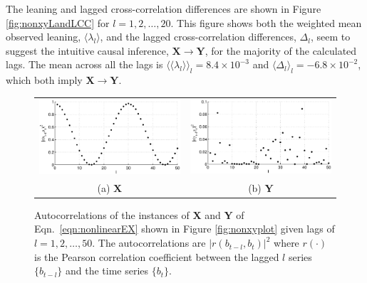 The leaning and lagged cross-correlation differences are shown in Figure \ref{fig:nonxyLandLCC} for $l=1,2,\ldots,20$.  This figure shows both the weighted mean observed leaning, $\langle \lambda_l\rangle$, and the lagged cross-correlation differences, $\Delta_l$, seem to suggest the intuitive causal inference, $\mathbf{X}\rightarrow\mathbf{Y}$, for the majority of the calculated lags.  The mean across all the lags is $\langle\langle\lambda_l\rangle\rangle_l=8.4\times 10^{-3}$ and $\langle\Delta_l\rangle_l=-6.8\times 10^{-2}$, which both imply $\mathbf{X}\rightarrow\mathbf{Y}$.  
\begin{figure}[ht]
\begin{tabular}{cc}
\includegraphics[scale=0.48]{NonlinearResponseExample_autocorrX.eps} & \includegraphics[scale=0.48]{NonlinearResponseExample_autocorrY.eps} \\
(a) $\mathbf{X}$ & (b) $\mathbf{Y}$
\end{tabular}
\caption{Autocorrelations of the instances of $\mathbf{X}$ and $\mathbf{Y}$ of Eqn.\ \ref{eqn:nonlinearEX} shown in Figure \ref{fig:nonxyplot} given lags of $l=1,2,\ldots,50$.  The autocorrelations are $|r(b_{t-l},b_t)|^2$ where $r(\cdot)$ is the Pearson correlation coefficient between the lagged $l$ series $\{b_{t-l}\}$ and the time series $\{b_{t}\}$.}
\label{fig:nonxyautocorr}
\end{figure}
